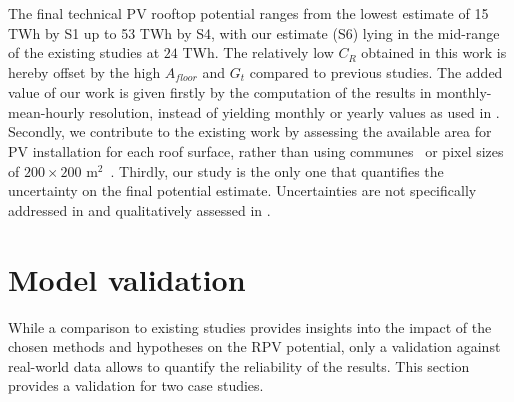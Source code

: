 The final technical PV rooftop potential ranges from the lowest estimate of 15 TWh by S1 up to 53 TWh by S4, with our estimate (S6) lying in the mid-range of the existing studies at $24$ TWh. 
The relatively low $C_R$ obtained in this work is hereby offset by the high $A_\mathit{floor}$ and $G_t$ compared to previous studies.
%
The added value of our work is given firstly by the computation of the results in monthly-mean-hourly resolution, instead of yielding monthly or yearly values as used in \cite{klauser_solarpotentialanalyse_2016, assouline_quantifying_2017, assouline_large-scale_2018}. Secondly, we contribute to the existing work by assessing the available area for PV installation for each roof surface, rather than using communes~\cite{assouline_quantifying_2017} or pixel sizes of $200 \times 200$ m$^2$~\cite{assouline_large-scale_2018}. Thirdly, our study is the only one that quantifies the uncertainty on the final potential estimate. 
Uncertainties are not specifically addressed in \cite{assouline_quantifying_2017, assouline_large-scale_2018, iea_potential_2002} and qualitatively assessed in \cite{klauser_solarpotentialanalyse_2016, buffat_scalable_2018}.



\section{Model validation}
\label{solar_scenarios}

While a comparison to existing studies provides insights into the impact of the chosen methods and hypotheses on the RPV potential, 
only a validation against real-world data allows to quantify the reliability of the results.
This section provides a validation for two case studies.

